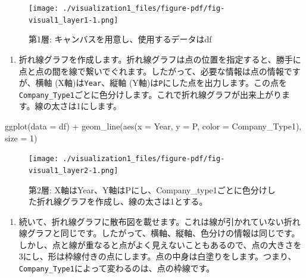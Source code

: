 \documentclass[
  a4paper,
  pandoc,
  ja=standard,
  jafont=haranoaji]{bxjsbook}
\newenvironment{Shaded}{\begin{snugshade}}{\end{snugshade}}
\newcommand{\AttributeTok}[1]{\textcolor[rgb]{0.00,0.48,0.65}{#1}}
\newcommand{\DecValTok}[1]{\textcolor[rgb]{0.68,0.00,0.00}{#1}}
\newcommand{\FunctionTok}[1]{\textcolor[rgb]{0.28,0.35,0.67}{#1}}
\newcommand{\NormalTok}[1]{\textcolor[rgb]{0.00,0.48,0.65}{#1}}
\newcommand{\SpecialCharTok}[1]{\textcolor[rgb]{0.37,0.37,0.37}{#1}}
\providecommand{\tightlist}{%
  \setlength{\itemsep}{0pt}\setlength{\parskip}{0pt}}
\begin{document}
\begin{figure}[H]

{\centering \texttt{[image: ./visualization1\_files/figure-pdf/fig-visual1\_layer1-1.png]}

}

\caption{\label{fig-visual1_layer1}第1層:
キャンバスを用意し、使用するデータはdf}

\end{figure}

\begin{enumerate}
\def\labelenumi{\arabic{enumi}.}
\setcounter{enumi}{1}
\tightlist
\item
  折れ線グラフを作成します。折れ線グラフは点の位置を指定すると、勝手に点と点の間を線で繋いでぐれます。したがって、必要な情報は点の情報ですが、横軸
  (X軸)は\texttt{Year}、縦軸
  (Y軸)は\texttt{P}にした点を出力します。この点を\texttt{Company\_Type1}ごとに色分けします。これで折れ線グラフが出来上がります。線の太さは1にします。
\end{enumerate}

\begin{Shaded}
\begin{Highlighting}[numbers=left,,]
\FunctionTok{ggplot}\NormalTok{(}\AttributeTok{data =}\NormalTok{ df) }\SpecialCharTok{+}
  \FunctionTok{geom\_line}\NormalTok{(}\FunctionTok{aes}\NormalTok{(}\AttributeTok{x =}\NormalTok{ Year, }\AttributeTok{y =}\NormalTok{ P, }\AttributeTok{color =}\NormalTok{ Company\_Type1), }
            \AttributeTok{size =} \DecValTok{1}\NormalTok{)}
\end{Highlighting}
\end{Shaded}

\begin{figure}[H]

{\centering \texttt{[image: ./visualization1\_files/figure-pdf/fig-visual1\_layer2-1.png]}

}

\caption{\label{fig-visual1_layer2}第2層:
X軸はYear、Y軸はPにし、Company\_type1ごとに色分けした折れ線グラフを作成し、線の太さは1とする。}

\end{figure}

\begin{enumerate}
\def\labelenumi{\arabic{enumi}.}
\setcounter{enumi}{2}
\tightlist
\item
  続いて、折れ線グラフに散布図を載せます。これは線が引かれていない折れ線グラフと同じです。したがって、横軸、縦軸、色分けの情報は同じです。しかし、点と線が重なると点がよく見えないこともあるので、点の大きさを3にし、形は枠線付きの点にします。点の中身は白塗りをします。つまり、\texttt{Company\_Type1}によって変わるのは、点の枠線です。
\end{enumerate}
\end{document}

